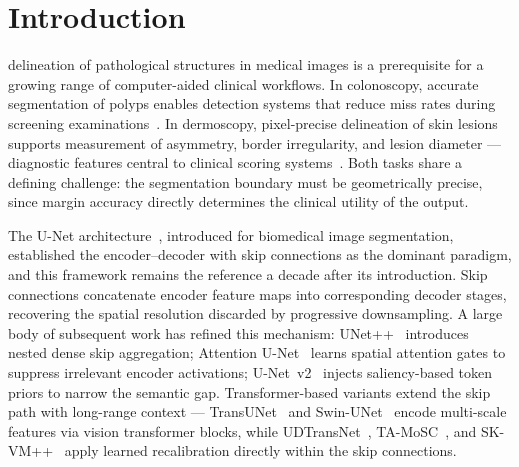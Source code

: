 \documentclass[journal]{IEEEtran}
\begin{document}
\section{Introduction}\label{sec:intro}

 delineation of pathological structures in medical
images is a prerequisite for a growing range of computer-aided clinical
workflows.
In colonoscopy, accurate segmentation of polyps enables detection systems
that reduce miss rates during screening
examinations~\cite{jha2020kvasir,bernal2015cvc}.
In dermoscopy, pixel-precise delineation of skin lesions supports measurement
of asymmetry, border irregularity, and lesion diameter --- diagnostic features
central to clinical scoring systems~\cite{codella2019isic}.
Both tasks share a defining challenge: the segmentation boundary must be
geometrically precise, since margin accuracy directly determines the clinical
utility of the output.

The U-Net architecture~\cite{ronneberger2015unet}, introduced for biomedical
image segmentation, established the encoder--decoder with skip connections as
the dominant paradigm, and this framework remains the reference a decade after
its introduction.
Skip connections concatenate encoder feature maps into corresponding decoder
stages, recovering the spatial resolution discarded by progressive downsampling.
A large body of subsequent work has refined this mechanism:
UNet++~\cite{zhou2019unetpp} introduces nested dense skip aggregation;
Attention U-Net~\cite{oktay2018attnunet} learns spatial attention gates to
suppress irrelevant encoder activations; U-Net~v2~\cite{peng2023unetv2} injects
saliency-based token priors to narrow the semantic gap.
Transformer-based variants extend the skip path with long-range context ---
TransUNet~\cite{chen2021transunet} and Swin-UNet~\cite{cao2021swinunet} encode
multi-scale features via vision transformer blocks, while
UDTransNet~\cite{wang2024udtransnet}, TA-MoSC~\cite{tamosc2025}, and
SK-VM++~\cite{wu2025skvmpp} apply learned recalibration directly within the
skip connections.
\end{document}
